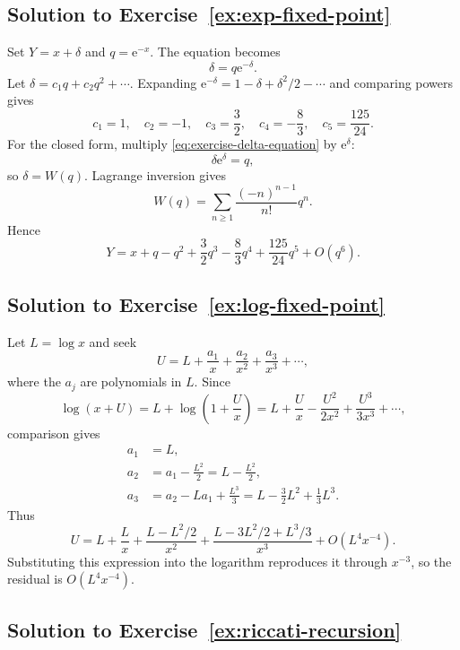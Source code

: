 \documentclass[11pt,oneside]{book}
\theoremstyle{definition}
\theoremstyle{remark}
\newcommand{\e}{\mathrm{e}}
\newcommand{\bigO}{O}
\begin{document}
\subsection*{Solution to Exercise~\ref{ex:exp-fixed-point}}

Set $Y=x+\delta$ and $q=\e^{-x}$. The equation becomes
\begin{equation}
  \delta=q\e^{-\delta}.
  \label{eq:exercise-delta-equation}
\end{equation}
Let $\delta=c_1q+c_2q^2+\cdots$. Expanding
$\e^{-\delta}=1-\delta+\delta^2/2-\cdots$ and comparing powers gives
\[
  c_1=1,
  \quad c_2=-1,
  \quad c_3=\frac32,
  \quad c_4=-\frac83,
  \quad c_5=\frac{125}{24}.
\]
For the closed form, multiply \eqref{eq:exercise-delta-equation} by
$\e^\delta$:
\[
  \delta\e^\delta=q,
\]
so $\delta=W(q)$. Lagrange inversion gives
\[
  W(q)=\sum_{n\ge1}\frac{(-n)^{n-1}}{n!}q^n.
\]
Hence
\[
  \boxed{
  Y=x+q-q^2+\frac32q^3-\frac83q^4
      +\frac{125}{24}q^5+\bigO(q^6)}.
\]

\subsection*{Solution to Exercise~\ref{ex:log-fixed-point}}

Let $L=\log x$ and seek
\[
  U=L+\frac{a_1}{x}+\frac{a_2}{x^2}+\frac{a_3}{x^3}+\cdots,
\]
where the $a_j$ are polynomials in $L$. Since
\[
  \log(x+U)=L+\log\left(1+\frac{U}{x}\right)
  =L+\frac{U}{x}-\frac{U^2}{2x^2}
      +\frac{U^3}{3x^3}+\cdots,
\]
comparison gives
\begin{align*}
  a_1&=L,\\
  a_2&=a_1-\frac{L^2}{2}=L-\frac{L^2}{2},\\
  a_3&=a_2-La_1+\frac{L^3}{3}
      =L-\frac32L^2+\frac13L^3.
\end{align*}
Thus
\[
  \boxed{
  U=L+\frac{L}{x}
  +\frac{L-L^2/2}{x^2}
  +\frac{L-3L^2/2+L^3/3}{x^3}
  +\bigO(L^4x^{-4})}.
\]
Substituting this expression into the logarithm reproduces it through $x^{-3}$,
so the residual is $\bigO(L^4x^{-4})$.

\subsection*{Solution to Exercise~\ref{ex:riccati-recursion}}
\end{document}
